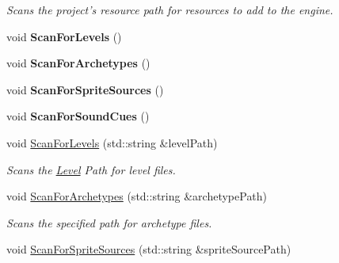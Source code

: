 \begin{DoxyCompactItemize}
\begin{DoxyCompactList}\small\item\em Scans the project's resource path for resources to add to the engine. \end{DoxyCompactList}\item 
\hypertarget{classDCEngine_1_1Systems_1_1Content_adf21f885586442b8e2ae40a87be93172}{void {\bfseries Scan\-For\-Levels} ()}\label{classDCEngine_1_1Systems_1_1Content_adf21f885586442b8e2ae40a87be93172}

\item 
\hypertarget{classDCEngine_1_1Systems_1_1Content_a29c58a6b10a1f9deaabc0e7aac4db1df}{void {\bfseries Scan\-For\-Archetypes} ()}\label{classDCEngine_1_1Systems_1_1Content_a29c58a6b10a1f9deaabc0e7aac4db1df}

\item 
\hypertarget{classDCEngine_1_1Systems_1_1Content_a06c842b8dbba90ba61ec66edc05eaedf}{void {\bfseries Scan\-For\-Sprite\-Sources} ()}\label{classDCEngine_1_1Systems_1_1Content_a06c842b8dbba90ba61ec66edc05eaedf}

\item 
\hypertarget{classDCEngine_1_1Systems_1_1Content_a0c44870abb43ae764b3c2c3ef0911942}{void {\bfseries Scan\-For\-Sound\-Cues} ()}\label{classDCEngine_1_1Systems_1_1Content_a0c44870abb43ae764b3c2c3ef0911942}

\item 
\hypertarget{classDCEngine_1_1Systems_1_1Content_a89d8da4859096cda973d6c4ad5636d57}{void \hyperlink{classDCEngine_1_1Systems_1_1Content_a89d8da4859096cda973d6c4ad5636d57}{Scan\-For\-Levels} (std\-::string \&level\-Path)}\label{classDCEngine_1_1Systems_1_1Content_a89d8da4859096cda973d6c4ad5636d57}

\begin{DoxyCompactList}\small\item\em Scans the \hyperlink{classDCEngine_1_1Level}{Level} Path for level files. \end{DoxyCompactList}\item 
\hypertarget{classDCEngine_1_1Systems_1_1Content_a63a432212a81871dafdd5aad9b3b3712}{void \hyperlink{classDCEngine_1_1Systems_1_1Content_a63a432212a81871dafdd5aad9b3b3712}{Scan\-For\-Archetypes} (std\-::string \&archetype\-Path)}\label{classDCEngine_1_1Systems_1_1Content_a63a432212a81871dafdd5aad9b3b3712}

\begin{DoxyCompactList}\small\item\em Scans the specified path for archetype files. \end{DoxyCompactList}\item 
\hypertarget{classDCEngine_1_1Systems_1_1Content_a3d8d040abd7214ca68b81af33fe93ff2}{void \hyperlink{classDCEngine_1_1Systems_1_1Content_a3d8d040abd7214ca68b81af33fe93ff2}{Scan\-For\-Sprite\-Sources} (std\-::string \&sprite\-Source\-Path)}\label{classDCEngine_1_1Systems_1_1Content_a3d8d040abd7214ca68b81af33fe93ff2}


\end{DoxyCompactItemize}
